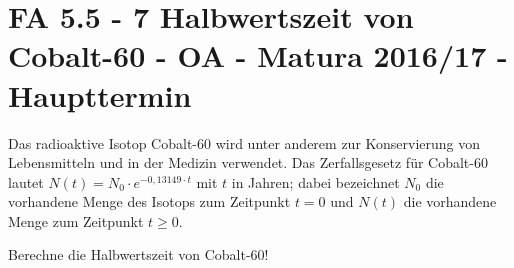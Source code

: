 \section{FA 5.5 - 7 Halbwertszeit von Cobalt-60 - OA - Matura 2016/17 - Haupttermin}

\begin{beispiel}[FA 5.5]{1} %
Das radioaktive Isotop Cobalt-60 wird unter anderem zur Konservierung von Lebensmitteln und in
der Medizin verwendet. Das Zerfallsgesetz für Cobalt-60 lautet $N(t) = N_0\cdot e^{-0,13149 \cdot t}$ mit $t$ in Jahren; dabei bezeichnet $N_0$ die vorhandene Menge des Isotops zum Zeitpunkt $t = 0$ und $N(t)$ die vorhandene Menge zum Zeitpunkt $t \geq 0$. \leer

Berechne die Halbwertszeit von Cobalt-60!

\end{beispiel}